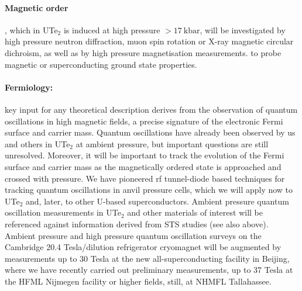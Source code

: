 \paragraph{Magnetic order}, which in UTe$_2$ is induced at high pressure $>\SI{17}{\kilo\bar}$, will be investigated by high pressure neutron diffraction, muon spin rotation or X-ray magnetic circular dichroism, as well as by high pressure magnetisation measurements.  to probe magnetic or superconducting ground state properties. 
\paragraph{Fermiology:}
key input for any
theoretical description derives from the observation of quantum oscillations in high magnetic fields, a precise signature of the electronic Fermi surface and
carrier mass. Quantum oscillations have already been observed by us and others in UTe$_2$ at ambient pressure, but important questions are still unresolved. Moreover, it will be important to track the evolution of the Fermi surface and carrier mass as the magnetically ordered state is approached and crossed with pressure. We have pioneered rf tunnel-diode based techniques for tracking quantum oscillations in anvil pressure cells, which we will apply now to UTe$_2$ and, later, to other U-based superconductors. Ambient pressure quantum oscillation measurements in UTe$_2$ and other materials of interest will be referenced against information derived from STS studies (see also above).
Ambient pressure and high pressure quantum oscillation surveys on the Cambridge 20.4 Tesla/dilution refrigerator cryomagnet will be augmented by measurements up to 30 Tesla at the new all-superconducting facility in Beijing, where we have recently carried out preliminary measurements, up to 37 Tesla at the HFML Nijmegen facility or higher fields, still, at NHMFL Tallahassee. 
 


